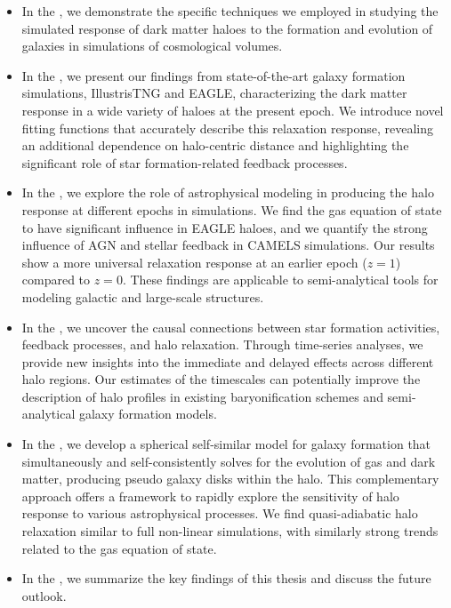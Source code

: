 \begin{itemize}
    \item In the , we demonstrate the specific techniques we employed in studying the simulated response of dark matter haloes to the formation and evolution of galaxies in simulations of cosmological volumes.
    
    \item In the , we present our findings from state-of-the-art galaxy formation simulations, IllustrisTNG and EAGLE, characterizing the dark matter response in a wide variety of haloes at the present epoch. We introduce novel fitting functions that accurately describe this relaxation response, revealing an additional dependence on halo-centric distance and highlighting the significant role of star formation-related feedback processes.
    
    \item In the , we explore the role of astrophysical modeling in producing the halo response at different epochs in simulations. We find the gas equation of state to have significant influence in EAGLE haloes, and we quantify the strong influence of AGN and stellar feedback in CAMELS simulations. Our results show a more universal relaxation response at an earlier epoch ($z=1$) compared to $z=0$. These findings are applicable to semi-analytical tools for modeling galactic and large-scale structures.
    
    \item In the , we uncover the causal connections between star formation activities, feedback processes, and halo relaxation. Through time-series analyses, we provide new insights into the immediate and delayed effects across different halo regions. Our estimates of the timescales can potentially improve the description of halo profiles in existing baryonification schemes and semi-analytical galaxy formation models.

    \item In the , we develop a spherical self-similar model for galaxy formation that simultaneously and self-consistently solves for the evolution of gas and dark matter, producing pseudo galaxy disks within the halo. This complementary approach offers a framework to rapidly explore the sensitivity of halo response to various astrophysical processes. We find quasi-adiabatic halo relaxation similar to full non-linear simulations, with similarly strong trends related to the gas equation of state.

    \item In the , we summarize the key findings of this thesis and discuss the future outlook.
\end{itemize}
